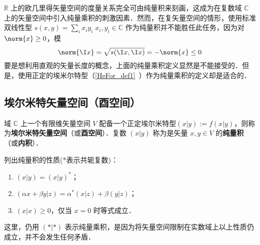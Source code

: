 
\begin{issues}
\issueTODO
\end{issues}

$\mathbb{R}$ 上的欧几里得矢量空间的度量关系完全可由纯量积来刻画，这成为在复数域 $\mathbb{C}$ 上的矢量空间中引入纯量乘积的刺激因素．然而，在复矢量空间的情形，使用标准双线性型 $s( x, y)=\sum_{i}x_iy_i\;x_i,y_i\in\mathbb{C}$ 作为纯量积并不能胜任此任务，因为对 $\norm{x}\geq0$，模
\begin{equation}
\norm{\I x}=\sqrt{s(\I x,\I x)}=-\norm{ x}\leq0
\end{equation}
要是想利用直观的矢量长度的概念，上面的纯量乘积定义显然是不能接受的．但是，使用正定的埃米尔特型（\autoref{HeFor_def1}~）作为纯量乘积的定义却是适合的．
\subsection{埃尔米特矢量空间（酉空间）}
\begin{definition}{}\label{HVorUV_def1}
域 $\mathbb{C}$ 上一个有限维矢量空间 $V$ 配备一个正定埃尔米特型$( x|  y):=f(  x|  y)$，则称为\textbf{埃尔米特矢量空间}（或\textbf{酉空间}）．复数 $(  x|  y)$ 称为是矢量 $  x,  y\in V$ 的\textbf{纯量积}（或\textbf{内积}）．
\end{definition}
列出纯量积的性质(*表示共轭复数)：
\begin{enumerate}
\item $(  x|  y)=(  x|  y)^*$；
\item $(\alpha  x+\beta  y|  z)=\alpha^*(  x|  z)+\beta(  y|  z)$；
\item $(  x|  x)\geq0$，仅当 $  x=  0$ 时等式成立．
\end{enumerate}

这里，仍用 $(*|*)$ 表示纯量乘积，是因为将矢量空间限制在实数域上以上性质仍成立，并不会发生任何矛盾．


